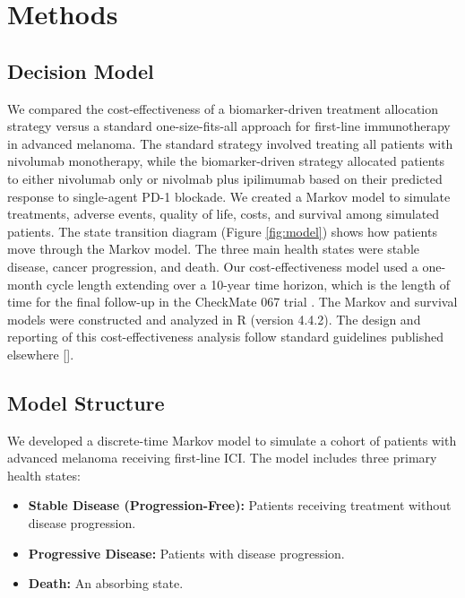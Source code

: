 \documentclass[preprint, 3p,
authoryear]{elsarticle} %
\begin{document}
\section{Methods}\label{methods}

\subsection{Decision Model}\label{decision-model}

We compared the cost-effectiveness of a biomarker-driven treatment
allocation strategy versus a standard one-size-fits-all approach for
first-line immunotherapy in advanced melanoma. The standard strategy
involved treating all patients with nivolumab monotherapy, while the
biomarker-driven strategy allocated patients to either nivolumab only or
nivolmab plus ipilimumab based on their predicted response to
single-agent PD-1 blockade. We created a Markov model to simulate
treatments, adverse events, quality of life, costs, and survival among
simulated patients. The state transition diagram (Figure
\hyperref[fig:model]{\ref{fig:model}}) shows how patients move through
the Markov model. The three main health states were stable disease,
cancer progression, and death. Our cost-effectiveness model used a
one-month cycle length extending over a 10-year time horizon, which is
the length of time for the final follow-up in the CheckMate 067 trial
\citep{checkmate067}. The Markov and survival models were constructed
and analyzed in R (version 4.4.2). The design and reporting of this
cost-effectiveness analysis follow standard guidelines published
elsewhere {[}\cite{Sanders2016}{]}.

\subsection{Model Structure}\label{model-structure}

We developed a discrete-time Markov model to simulate a cohort of
patients with advanced melanoma receiving first-line ICI. The model
includes three primary health states:

\begin{itemize}
\item
  \textbf{Stable Disease (Progression-Free):} Patients receiving
  treatment without disease progression.
\item
  \textbf{Progressive Disease:} Patients with disease progression.
\item
  \textbf{Death:} An absorbing state.
\end{itemize}
\end{document}
